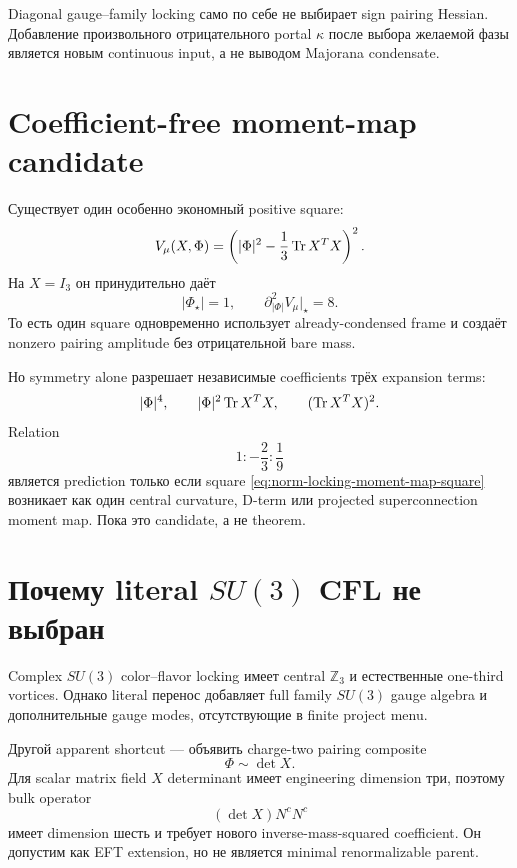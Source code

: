 \begin{nogocriterion}
Diagonal gauge--family locking само по себе не выбирает sign pairing
Hessian. Добавление произвольного отрицательного portal \(\kappa\) после
выбора желаемой фазы является новым continuous input, а не выводом
Majorana condensate.
\end{nogocriterion}

\section{Coefficient-free moment-map candidate}

Существует один особенно экономный positive square:
\begin{equation}
 V_\mu(X,\Phi)
 =\left(
 |\Phi|^2-\frac13\operatorname{Tr} X^TX
 \right)^2.
 \label{eq:norm-locking-moment-map-square}
\end{equation}
На \(X=I_3\) он принудительно даёт
\begin{equation}
 |\Phi_\star|=1,
 \qquad
 \partial_{|\Phi|}^2V_\mu\big|_\star=8.
\end{equation}
То есть один square одновременно использует already-condensed frame и
создаёт nonzero pairing amplitude без отрицательной bare mass.

Но symmetry alone разрешает независимые coefficients трёх expansion terms:
\begin{equation}
 |\Phi|^4,
 \qquad
 |\Phi|^2\operatorname{Tr} X^TX,
 \qquad
 (\operatorname{Tr} X^TX)^2.
\end{equation}
Relation
\begin{equation}
 1:-\frac23:\frac19
\end{equation}
является prediction только если square
\eqref{eq:norm-locking-moment-map-square} возникает как один central
curvature, D-term или projected superconnection moment map. Пока это
candidate, а не theorem.

\section{Почему literal \texorpdfstring{\(SU(3)\)}{SU(3)} CFL не выбран}

Complex \(SU(3)\) color--flavor locking имеет central \(\mathbb Z_3\) и
естественные one-third vortices. Однако literal перенос добавляет full
family \(SU(3)\) gauge algebra и дополнительные gauge modes, отсутствующие
в finite project menu.

Другой apparent shortcut --- объявить charge-two pairing composite
\begin{equation}
 \Phi\sim\det X.
\end{equation}
Для scalar matrix field \(X\) determinant имеет engineering dimension три,
поэтому bulk operator
\begin{equation}
 (\det X)N^cN^c
\end{equation}
имеет dimension шесть и требует нового inverse-mass-squared coefficient.
Он допустим как EFT extension, но не является minimal renormalizable parent.

